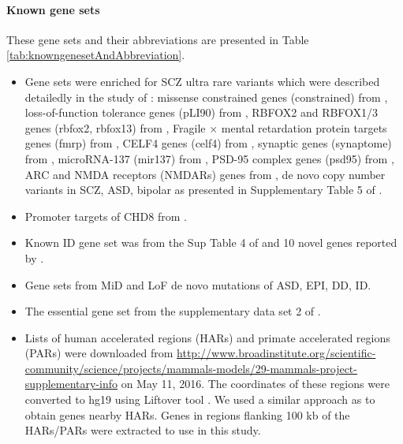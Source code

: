 \documentclass[]{article}
\begin{document}
\paragraph{Known gene sets}

These gene sets and their abbreviations are presented in Table \ref{tab:knowngenesetAndAbbreviation}.

\begin{itemize}
\item Gene sets were enriched for SCZ ultra rare variants which were
  described detailedly in the study
  of  \cite{genovese2016increased}: missense constrained genes
  (constrained) from \cite{samocha2014framework},
loss-of-function tolerance genes (pLI90) from \cite{lek2015analysis},
RBFOX2 and RBFOX1/3 genes (rbfox2, rbfox13) from \cite{weyn2014hits},
Fragile × mental retardation protein targets genes (fmrp) from \cite{darnell2011fmrp},
CELF4 genes (celf4) from \cite{wagnon2012celf4},
synaptic genes (synaptome) from \cite{pirooznia2012synaptomedb},
microRNA-137 (mir137) from \cite{robinson2015genetic},
PSD-95 complex genes (psd95) from \cite{bayes2011characterization},
ARC and NMDA   receptors (NMDARs) genes from \cite{kirov2012novo},
de novo copy number variants in SCZ, ASD, bipolar as presented in Supplementary
Table 5 of \cite{genovese2016increased}.

\item Promoter targets of CHD8 from \cite{cotney2015autism}.

\item Known ID gene set was from the Sup Table 4 of  \cite{lelieveld2016meta}
   and 10 novel genes reported by  \cite{lelieveld2016meta}.

\item Gene sets from MiD and LoF de novo mutations of ASD, EPI, DD, ID.

\item The essential gene set from the supplementary data set 2 of
  \cite{ji2016increased}.

\item Lists of human accelerated regions (HARs) and primate
  accelerated regions (PARs) \citep{lindblad2011high} were downloaded
  from
  \url{http://www.broadinstitute.org/scientific-community/science/projects/mammals-models/29-mammals-project-supplementary-info}
  on May 11, 2016. The coordinates of these regions were converted to
  hg19 using Liftover tool \citep{kent2002human}. We used a similar
  approach as \cite{xu2015genomic} to obtain genes nearby HARs. Genes
  in regions flanking 100 kb of the HARs/PARs were extracted to use in
  this study.


\end{itemize}
\end{document}
